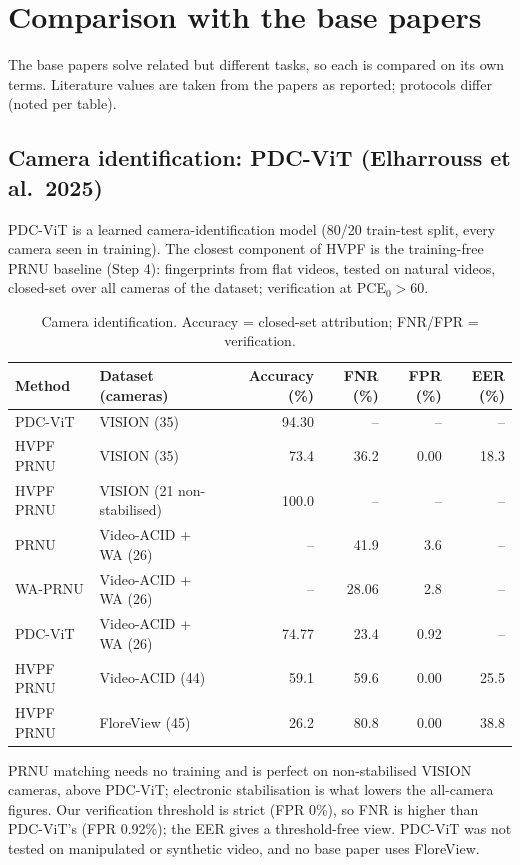 \documentclass[11pt,a4paper]{article}
\begin{document}
\section{Comparison with the base papers}
The base papers solve related but different tasks, so each is compared on its own terms. Literature values are taken from the papers as reported; protocols differ (noted per table).
\subsection{Camera identification: PDC-ViT (Elharrouss et al.~2025)}
PDC-ViT is a learned camera-identification model (80/20 train-test split, every camera seen in training). The closest component of HVPF is the training-free PRNU baseline (Step 4): fingerprints from flat videos, tested on natural videos, closed-set over all cameras of the dataset; verification at PCE$_0>60$.
\begin{table}[H]\centering\small\caption{Camera identification. Accuracy = closed-set attribution; FNR/FPR = verification.}\setlength{\tabcolsep}{4pt}\begin{tabular}{llrrrr}\toprule Method & Dataset (cameras) & Accuracy (\%) & FNR (\%) & FPR (\%) & EER (\%) \\\midrule
PDC-ViT \cite{pdcvit} & VISION (35) & 94.30 & -- & -- & -- \\
HVPF PRNU & VISION (35) & 73.4 & 36.2 & 0.00 & 18.3 \\
HVPF PRNU & VISION (21 non-stabilised) & 100.0 & -- & -- & -- \\
\midrule PRNU \cite{pdcvit} & Video-ACID + WA (26) & -- & 41.9 & 3.6 & -- \\
WA-PRNU \cite{pdcvit} & Video-ACID + WA (26) & -- & 28.06 & 2.8 & -- \\
PDC-ViT \cite{pdcvit} & Video-ACID + WA (26) & 74.77 & 23.4 & 0.92 & -- \\
HVPF PRNU & Video-ACID (44) & 59.1 & 59.6 & 0.00 & 25.5 \\
\midrule HVPF PRNU & FloreView (45) & 26.2 & 80.8 & 0.00 & 38.8 \\
\bottomrule\end{tabular}\end{table}
PRNU matching needs no training and is perfect on non-stabilised VISION cameras, above PDC-ViT; electronic stabilisation is what lowers the all-camera figures. Our verification threshold is strict (FPR 0\%), so FNR is higher than PDC-ViT's (FPR 0.92\%); the EER gives a threshold-free view. PDC-ViT was not tested on manipulated or synthetic video, and no base paper uses FloreView.
\end{document}
